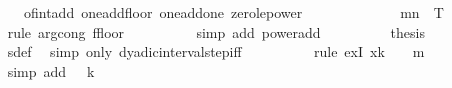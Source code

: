 \begin{isabellebody}
\ \ \ \ \ \ \ \ \ \ \ \ of{\isacharunderscore}{\kern0pt}int{\isacharunderscore}{\kern0pt}add\ one{\isacharunderscore}{\kern0pt}add{\isacharunderscore}{\kern0pt}floor\ one{\isacharunderscore}{\kern0pt}add{\isacharunderscore}{\kern0pt}one\ zero{\isacharunderscore}{\kern0pt}le{\isacharunderscore}{\kern0pt}power{\isacharparenright}{\kern0pt}\isanewline
\ \ \ \ \ \ \isamarkupfalse%
\ \isamarkupfalse%
\ {\isachardoublequoteopen}{\isachardot}{\kern0pt}{\isachardot}{\kern0pt}{\isachardot}{\kern0pt}\ {\isacharequal}{\kern0pt}\ {\isasymlfloor}{\isacharparenleft}{\kern0pt}{}\ {\isacharcircum}{\kern0pt}\ {\isacharparenleft}{\kern0pt}m{\isacharplus}{\kern0pt}n{\isacharplus}{\kern0pt}{}{\isacharparenright}{\kern0pt}{\isacharparenright}{\kern0pt}\ {\isacharasterisk}{\kern0pt}\ T{\isasymrfloor}{\isachardoublequoteclose}\isanewline
\ \ \ \ \ \ \ \ \isamarkupfalse%
\ {\isacharparenleft}{\kern0pt}rule\ arg{\isacharunderscore}{\kern0pt}cong{\isacharbrackleft}{\kern0pt}\ f{\isacharequal}{\kern0pt}floor{\isacharbrackright}{\kern0pt}{\isacharparenright}{\kern0pt}\isanewline
\ \ \ \ \ \ \ \ \isamarkupfalse%
\ {\isacharparenleft}{\kern0pt}simp\ add{\isacharcolon}{\kern0pt}\ power{\isacharunderscore}{\kern0pt}add{\isacharparenright}{\kern0pt}\isanewline
\ \ \ \ \ \ \isamarkupfalse%
\ \isamarkupfalse%
\ {\isacharquery}{\kern0pt}thesis\isanewline
\ \ \ \ \ \ \ \ \isamarkupfalse%
\ s{\isacharunderscore}{\kern0pt}def\ \isamarkupfalse%
\ {\isacharparenleft}{\kern0pt}simp\ only{\isacharcolon}{\kern0pt}\ dyadic{\isacharunderscore}{\kern0pt}interval{\isacharunderscore}{\kern0pt}step{\isacharunderscore}{\kern0pt}iff{\isacharparenright}{\kern0pt}\isanewline
\ \ \ \ \ \ \ \ \isamarkupfalse%
\ {\isacharparenleft}{\kern0pt}rule\ exI{\isacharbrackleft}{\kern0pt}\ x{\isacharequal}{\kern0pt}{\isachardoublequoteopen}k\ {\isacharasterisk}{\kern0pt}\ {\isacharparenleft}{\kern0pt}{}\ {\isacharcircum}{\kern0pt}\ {\isacharparenleft}{\kern0pt}m{\isacharplus}{\kern0pt}{}{\isacharparenright}{\kern0pt}{\isacharparenright}{\kern0pt}\ {\isacharminus}{\kern0pt}\ {}{\isachardoublequoteclose}{\isacharbrackright}{\kern0pt}{\isacharparenright}{\kern0pt}\isanewline
\ \ \ \ \ \ \ \ \isamarkupfalse%
\ {\isacharparenleft}{\kern0pt}simp\ add{\isacharcolon}{\kern0pt}\ {\isacartoucheopen}{}\ {\isacharless}{\kern0pt}\ k{\isacartoucheclose}{\isacharparenright}{\kern0pt}\isanewline

\end{isabellebody}
